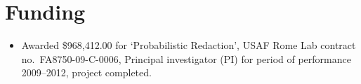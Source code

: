 \documentclass[letterpaper]{article}
\begin{document}
\section*{Funding}

\begin{itemize}
	\item Awarded \$968,412.00 for `Probabilistic Redaction', USAF Rome Lab contract
	no.\ FA8750-09-C-0006, Principal investigator (PI) for period of performance
	2009--2012, project completed.
\end{itemize}

%
%
%
%
%
%
%
%
%
%
%
\end{document}
